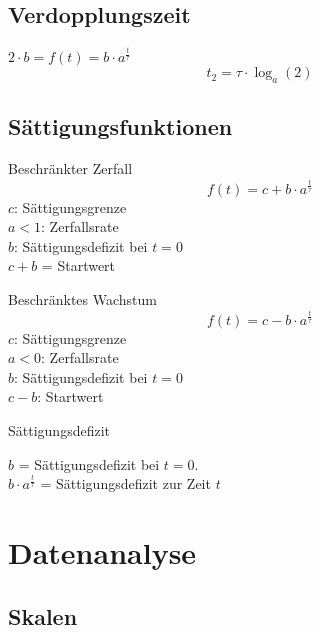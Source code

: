 \begin{multicols}{2}
\subsection{Verdopplungszeit}
$2\cdot{}b = f(t) = b\cdot{}a^{\frac{t}{\tau}}$
$$t_{2} = \tau\cdot{}\log_a(2)$$

\subsection{Sättigungsfunktionen}
\begin{gesetz}{Beschränkter Zerfall}{}
$$f(t) = c + b\cdot{}a^\frac{t}\tau$$
$c$: Sättigungsgrenze\\
$a<1$: Zerfallsrate\\
$b$: Sättigungsdefizit bei $t=0$\\
$c+b$ = Startwert 
\end{gesetz}

\begin{gesetz}{Beschränktes Wachstum}{}
$$f(t) = c - b\cdot{}a^\frac{t}\tau$$
$c$: Sättigungsgrenze\\
$a<0$: Zerfallsrate\\
$b$: Sättigungsdefizit bei $t=0$\\
$c-b$: Startwert
\end{gesetz}

\begin{bemerkung}{Sättigungsdefizit}{}

$b$ = Sättigungsdefizit bei $t=0$.\\
$b\cdot{}a^\frac{t}\tau$ = Sättigungsdefizit zur Zeit $t$
\end{bemerkung}

\end{multicols}

\hrulefill
\section{Datenanalyse}

\subsection{Skalen}
\vspace{5mm}




